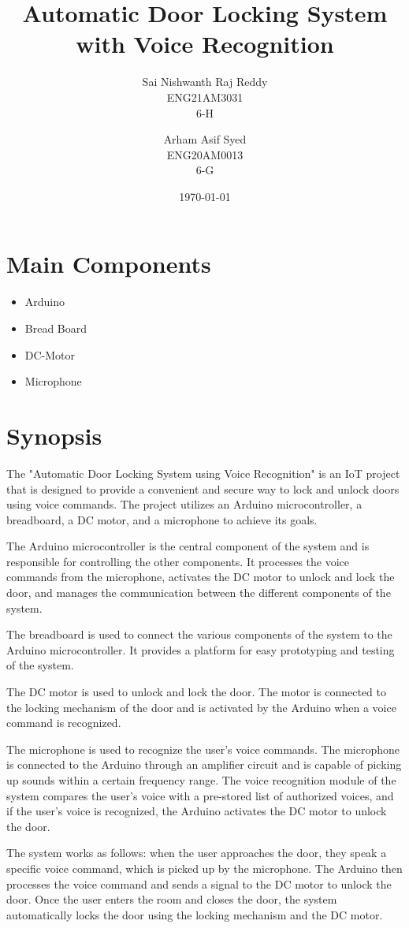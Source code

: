 \documentclass[11pt]{article}
\author{Sai Nishwanth Raj Reddy\\ENG21AM3031\\6-H
        \and
        Arham Asif Syed\\ENG20AM0013\\6-G
      }
\date{\today}
\title{Automatic Door Locking System with Voice Recognition}
\begin{document}
\maketitle


\section{Main Components}
\label{sec:orgab95d5c}
\begin{itemize}
\item Arduino
\item Bread Board
\item DC-Motor
\item Microphone
\end{itemize}

\section{Synopsis}
\label{sec:org2bd2df0}
The "Automatic Door Locking System using Voice Recognition" is an IoT project that is designed to provide a convenient and secure way to lock and unlock doors using voice commands. The project utilizes an Arduino microcontroller, a breadboard, a DC motor, and a microphone to achieve its goals.

The Arduino microcontroller is the central component of the system and is responsible for controlling the other components. It processes the voice commands from the microphone, activates the DC motor to unlock and lock the door, and manages the communication between the different components of the system.

The breadboard is used to connect the various components of the system to the Arduino microcontroller. It provides a platform for easy prototyping and testing of the system.

The DC motor is used to unlock and lock the door. The motor is connected to the locking mechanism of the door and is activated by the Arduino when a voice command is recognized.

The microphone is used to recognize the user's voice commands. The microphone is connected to the Arduino through an amplifier circuit and is capable of picking up sounds within a certain frequency range. The voice recognition module of the system compares the user's voice with a pre-stored list of authorized voices, and if the user's voice is recognized, the Arduino activates the DC motor to unlock the door.

The system works as follows: when the user approaches the door, they speak a specific voice command, which is picked up by the microphone. The Arduino then processes the voice command and sends a signal to the DC motor to unlock the door. Once the user enters the room and closes the door, the system automatically locks the door using the locking mechanism and the DC motor.
\end{document}
